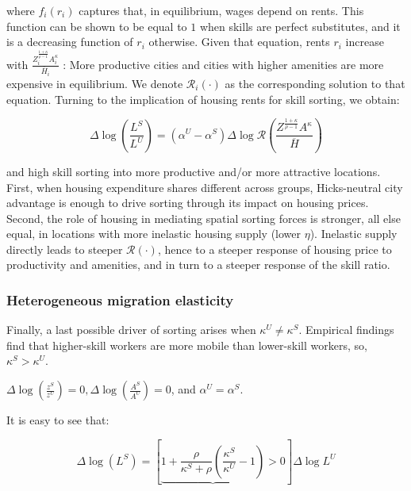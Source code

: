 where $f_i(r_i)$ captures that, in equilibrium, wages depend on rents. This function can be shown to be equal to $1$ when skills are perfect substitutes, and it is a decreasing function of $r_i$ otherwise. Given that equation, rents $r_i$ increase with $\frac{Z_i^{\frac{1 + \kappa}{\rho - 1}}A_i^{\kappa}}{\overline{H}_i}$ : More productive cities and cities with higher amenities are more expensive in equilibrium. We denote $\mathcal{R}_i(\cdot)$ as the corresponding solution to that equation. Turning to the implication of housing rents for skill sorting, we obtain:

\begin{equation}
  \Delta \log(\frac{L^S}{L^U}) = (\alpha^U - \alpha^S) \Delta \log \mathcal{R}(\frac{Z^{\frac{1 + \kappa}{\rho - 1}}A^{\kappa}}{\overline{H}} )
\end{equation}

and high skill sorting into more productive and/or more attractive locations. First, when housing expenditure shares different across groups, Hicks-neutral city advantage is enough to drive sorting through its impact on housing prices. Second, the role of housing in mediating spatial sorting forces is stronger, all else equal, in locations with more inelastic housing supply (lower $\eta$). Inelastic supply directly leads to steeper $\mathcal{R}(\cdot)$, hence to a steeper response of housing price to productivity and amenities, and in turn to a steeper response of the skill ratio.

\subsubsection{Heterogeneous migration elasticity}

Finally, a last possible driver of sorting arises when $\kappa^U \neq \kappa^S$. Empirical findings find that higher-skill workers are more mobile than lower-skill workers, so, $\kappa^S > \kappa^U$.

\begin{assumption}
  $\Delta \log (\frac{z^S}{z^U}) = 0, \Delta \log(\frac{A^S}{A^U}) = 0$, and $\alpha^U = \alpha^S$.
\end{assumption}

It is easy to see that:

\begin{equation}
  \Delta \log(L^S) = \left[ \underbrace{1 + \frac{\rho}{\kappa^S + \rho} (\frac{\kappa^S}{\kappa^U} - 1)}{ > 0} \right] \Delta \log L^U
\end{equation}

